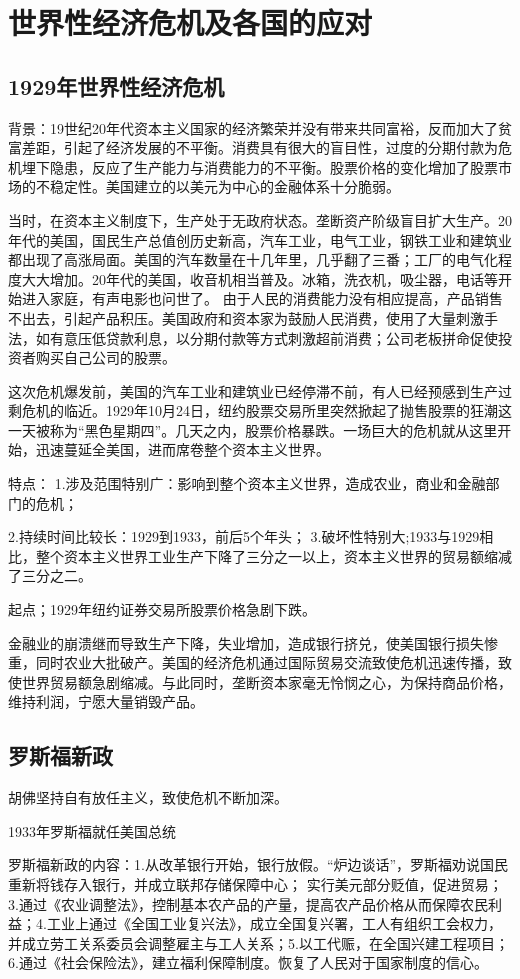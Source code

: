 \section{世界性经济危机及各国的应对}
\subsection{1929年世界性经济危机}
背景：19世纪20年代资本主义国家的经济繁荣并没有带来共同富裕，反而加大了贫富差距，引起了经济发展的不平衡。消费具有很大的盲目性，过度的分期付款为危机埋下隐患，反应了生产能力与消费能力的不平衡。股票价格的变化增加了股票市场的不稳定性。美国建立的以美元为中心的金融体系十分脆弱。

当时，在资本主义制度下，生产处于无政府状态。垄断资产阶级盲目扩大生产。20年代的美国，国民生产总值创历史新高，汽车工业，电气工业，钢铁工业和建筑业都出现了高涨局面。美国的汽车数量在十几年里，几乎翻了三番；工厂的电气化程度大大增加。20年代的美国，收音机相当普及。冰箱，洗衣机，吸尘器，电话等开始进入家庭，有声电影也问世了。
由于人民的消费能力没有相应提高，产品销售不出去，引起产品积压。美国政府和资本家为鼓励人民消费，使用了大量刺激手法，如有意压低贷款利息，以分期付款等方式刺激超前消费；公司老板拼命促使投资者购买自己公司的股票。

这次危机爆发前，美国的汽车工业和建筑业已经停滞不前，有人已经预感到生产过剩危机的临近。1929年10月24日，纽约股票交易所里突然掀起了抛售股票的狂潮这一天被称为“黑色星期四”。几天之内，股票价格暴跌。一场巨大的危机就从这里开始，迅速蔓延全美国，进而席卷整个资本主义世界。

特点：
1.涉及范围特别广：影响到整个资本主义世界，造成农业，商业和金融部门的危机；

2.持续时间比较长：1929到1933，前后5个年头；
3.破坏性特别大;1933与1929相比，整个资本主义世界工业生产下降了三分之一以上，资本主义世界的贸易额缩减了三分之二。

起点；1929年纽约证券交易所股票价格急剧下跌。

金融业的崩溃继而导致生产下降，失业增加，造成银行挤兑，使美国银行损失惨重，同时农业大批破产。美国的经济危机通过国际贸易交流致使危机迅速传播，致使世界贸易额急剧缩减。与此同时，垄断资本家毫无怜悯之心，为保持商品价格，维持利润，宁愿大量销毁产品。

\subsection{罗斯福新政}
胡佛坚持自有放任主义，致使危机不断加深。

1933年罗斯福就任美国总统

罗斯福新政的内容：1.从改革银行开始，银行放假。“炉边谈话”，罗斯福劝说国民重新将钱存入银行，并成立联邦存储保障中心；
实行美元部分贬值，促进贸易；3.通过《农业调整法》，控制基本农产品的产量，提高农产品价格从而保障农民利益；4.工业上通过《全国工业复兴法》，成立全国复兴署，工人有组织工会权力，并成立劳工关系委员会调整雇主与工人关系；5.以工代赈，在全国兴建工程项目；6.通过《社会保险法》，建立福利保障制度。恢复了人民对于国家制度的信心。

